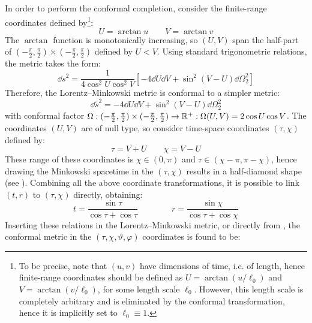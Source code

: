 In order to perform the conformal completion, consider the finite-range coordinates defined by\footnote{To be precise, note that $ (u,v) $ have dimensions of time, i.e. of length, hence finite-range coordinates should be defined as $ U = \arctan (u / \ell_0) $ and $ V = \arctan (v / \ell_0) $, for some length scale $ \ell_0 $. However, this length scale is completely arbitrary and is eliminated by the conformal transformation, hence it is implicitly set to $ \ell_0 \equiv 1 $.}:
\begin{equation*}
  U = \arctan u
  \qquad
  V = \arctan v
\end{equation*}
The $ \arctan $ function is monotonically increasing, so $ (U,V) $ span the half-part of $ (-\frac{\pi}{2} , \frac{\pi}{2}) \times (-\frac{\pi}{2} , \frac{\pi}{2}) $ defined by $ U < V $. Using standard trigonometric relations, the metric takes the form:
\begin{equation*}
  \dd s^2 = \frac{1}{4 \cos^2 U \cos^2 V} \left[ - 4 \dd U \dd V + \sin^2(V - U) \dd \Omega_2^2 \right]
\end{equation*}
Therefore, the Lorentz--Minkowski metric is conformal to a simpler metric:
\begin{equation}
  \dd \tilde{s}^2 = - 4 \dd U \dd V + \sin^2(V-U) \dd \Omega_2^2
  \label{eq:conf-aux}
\end{equation}
with conformal factor $ \Omega : (-\frac{\pi}{2} , \frac{\pi}{2}) \times (-\frac{\pi}{2} , \frac{\pi}{2}) \rightarrow \mathbb{R}^+ : \Omega(U,V) = 2 \cos U \cos V $. The coordinates $ (U,V) $ are of null type, so consider time-space coordinates $ (\tau , \chi) $ defined by:
\begin{equation*}
  \tau = V + U
  \qquad
  \chi = V - U
\end{equation*}
These range of these coordinates is $ \chi \in (0 , \pi) $ and $ \tau \in (\chi - \pi , \pi - \chi) $, hence drawing the Minkowski spacetime in the $ (\tau , \chi) $ results in a half-diamond shape (see ). Combining all the above coordinate transformations, it is possible to link $ (t,r) $ to $ (\tau , \chi ) $ directly, obtaining:
\begin{equation}
  t = \frac{\sin \tau}{\cos \tau + \cos \tau}
  \qquad \qquad
  r = \frac{\sin \chi}{\cos \tau + \cos \chi}
  \label{eq:esu-embedding}
\end{equation}
Inserting these relations in the Lorentz--Minkowski metric, or directly from , the conformal metric in the $ (\tau , \chi , \vartheta , \varphi) $ coordinates is found to be:
